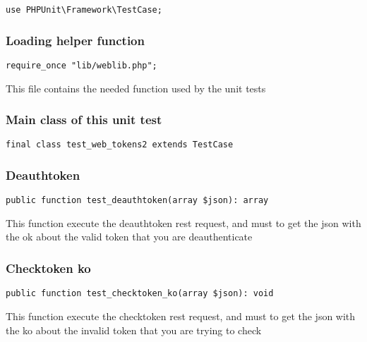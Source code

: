 \documentclass[a4paper]{article}
\begin{document}
\begin{lstlisting}
use PHPUnit\Framework\TestCase;
\end{lstlisting}

\hypertarget{toc85}{}
\subsubsection{Loading helper function}

\begin{lstlisting}
require_once "lib/weblib.php";
\end{lstlisting}

This file contains the needed function used by the unit tests

\hypertarget{toc86}{}
\subsubsection{Main class of this unit test}

\begin{lstlisting}
final class test_web_tokens2 extends TestCase
\end{lstlisting}

\hypertarget{toc87}{}
\subsubsection{Deauthtoken}

\begin{lstlisting}
public function test_deauthtoken(array $json): array
\end{lstlisting}

This function execute the deauthtoken rest request, and must to get the
json with the ok about the valid token that you are deauthenticate

\hypertarget{toc88}{}
\subsubsection{Checktoken ko}

\begin{lstlisting}
public function test_checktoken_ko(array $json): void
\end{lstlisting}

This function execute the checktoken rest request, and must to get the
json with the ko about the invalid token that you are trying to check

\end{document}
